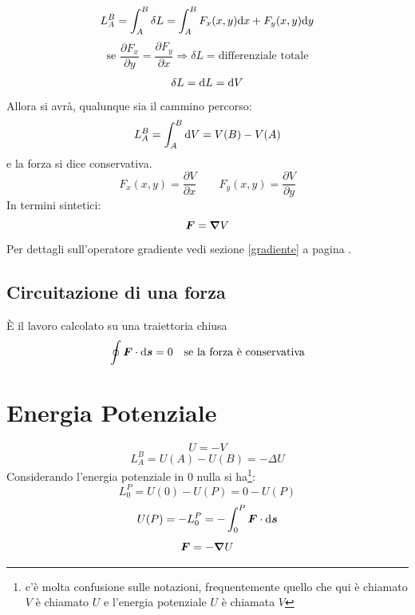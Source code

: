 \begin{equation*}L_A^B=\int_A^B\delta L=\int_A^B F_x(x,y)\mathrm{d} x+F_y(x,y)\mathrm{d} y\end{equation*}
\begin{equation*}\text{se } \frac{\partial F_x}{\partial y}=\frac{\partial F_y}{\partial x} \Rightarrow \delta L= \text{differenziale totale}\end{equation*}
\begin{equation*}\delta L=\mathrm{d} L=\mathrm{d} V\end{equation*}
Allora si avrà, qualunque sia il cammino percorso:
\begin{equation*}L_A^B=\int_A^B \mathrm{d} V=V(B)-V(A)\end{equation*}
e la forza si dice conservativa.
\begin{equation*}F_x(x,y)=\frac{\partial V}{\partial x}\qquad F_y(x,y)=\frac{\partial V}{\partial y}\end{equation*}
In termini sintetici:
 \begin{equation*}\boldsymbol{F}=\boldsymbol{\nabla} V\end{equation*}
 Per dettagli sull'operatore
gradiente vedi sezione \ref{gradiente} a pagina
\pageref{gradiente}.

\subsection{Circuitazione di una forza}
\`E il lavoro calcolato su una traiettoria chiusa
\begin{equation*}\oint \boldsymbol{F}\cdot\mathrm{d} \boldsymbol{s}=0 \quad \text{se la forza è conservativa}\end{equation*}

\section{Energia Potenziale}
\begin{equation*}U=-V\end{equation*}
\begin{equation*}L_A^B=U(A)-U(B)=-\Delta U\end{equation*}
Considerando l'energia potenziale in $0$ nulla si ha\footnote{c'è molta confusione sulle notazioni, frequentemente quello che qui è chiamato $V$ è chiamato $U$ e l'energia potenziale $U$ è chiamata $V$}:
\begin{equation*}L_0^P=U(0)-U(P)=0-U(P)\end{equation*}
\begin{equation*}U(P)=-L_0^P=-\int_0^P \boldsymbol{F}\cdot\mathrm{d} \boldsymbol{s}\end{equation*}
\begin{equation*}\boldsymbol{F}=-\boldsymbol{\nabla} U\end{equation*}

